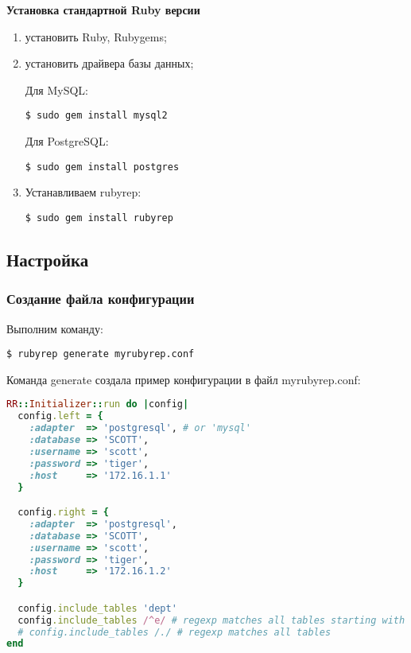 \textbf{Установка стандартной Ruby версии}

\begin{enumerate}
  \item установить Ruby, Rubygems;
  \item установить драйвера базы данных;

  Для MySQL:
  \begin{lstlisting}[label=lst:rubyrep1,caption=Установка]
  $ sudo gem install mysql2
  \end{lstlisting}

  Для PostgreSQL:
  \begin{lstlisting}[label=lst:rubyrep2,caption=Установка]
  $ sudo gem install postgres
  \end{lstlisting}

  \item Устанавливаем rubyrep:
  \begin{lstlisting}[label=lst:rubyrep3,caption=Установка]
  $ sudo gem install rubyrep
  \end{lstlisting}
\end{enumerate}


\subsection{Настройка}

\subsubsection{Создание файла конфигурации}

Выполним команду:

\begin{lstlisting}[label=lst:rubyrep4,caption=Настройка]
$ rubyrep generate myrubyrep.conf
\end{lstlisting}

Команда generate создала пример конфигурации в файл myrubyrep.conf:

\begin{lstlisting}[language=Ruby,label=lst:rubyrep5,caption=Настройка]
RR::Initializer::run do |config|
  config.left = {
    :adapter  => 'postgresql', # or 'mysql'
    :database => 'SCOTT',
    :username => 'scott',
    :password => 'tiger',
    :host     => '172.16.1.1'
  }

  config.right = {
    :adapter  => 'postgresql',
    :database => 'SCOTT',
    :username => 'scott',
    :password => 'tiger',
    :host     => '172.16.1.2'
  }

  config.include_tables 'dept'
  config.include_tables /^e/ # regexp matches all tables starting with e
  # config.include_tables /./ # regexp matches all tables
end
\end{lstlisting}

